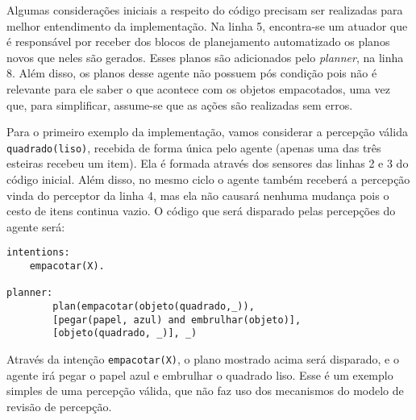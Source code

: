 Algumas considerações iniciais a respeito do código precisam ser realizadas para melhor entendimento da implementação. Na linha 5, encontra-se um atuador que é responsável por receber dos blocos de planejamento automatizado os planos novos que neles são gerados. Esses planos são adicionados pelo \emph{planner}, na linha 8. Além disso, os planos desse agente não possuem pós condição pois não é relevante para ele saber o que acontece com os objetos empacotados, uma vez que, para simplificar, assume-se que as ações são realizadas sem erros.

\begin{example}{}
    Para o primeiro exemplo da implementação, vamos considerar a percepção válida \texttt{quadrado(liso)}, recebida de forma única pelo agente (apenas uma das três esteiras recebeu um item). Ela é formada através dos sensores das linhas 2 e 3 do código inicial. Além disso, no mesmo ciclo o agente também receberá a percepção vinda do perceptor da linha 4, mas ela não causará nenhuma mudança pois o cesto de itens continua vazio. O código que será disparado pelas percepções do agente será:
    \begin{lstlisting}
intentions:
    empacotar(X).

planner:
    	plan(empacotar(objeto(quadrado,_)),
    	[pegar(papel, azul) and embrulhar(objeto)],
    	[objeto(quadrado, _)], _)
    \end{lstlisting}{}
    
    Através da intenção \texttt{empacotar(X)}, o plano mostrado acima será disparado, e o agente irá pegar o papel azul e embrulhar o quadrado liso. Esse é um exemplo simples de uma percepção válida, que não faz uso dos mecanismos do modelo de revisão de percepção.
\end{example}

